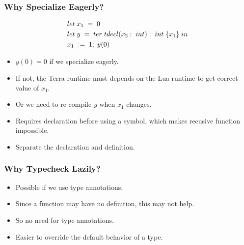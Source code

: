 \documentclass{beamer}
\begin{document}
\begin{frame}
	\frametitle{Why Specialize Eagerly?}
  \begin{equation*}
    \begin{split}
      & let \thickspace x_1\thickspace =\thickspace 0 \\
      & let \thickspace y\thickspace =\thickspace ter\thickspace tdecl(x_2:\thickspace int):\thickspace int\thickspace \{x_1\}\thickspace in \\
      & x_1\thickspace :=\thickspace 1;\thickspace y(0)
    \end{split}
  \end{equation*} \pause
  \newline
  \begin{itemize}
  \item $y(0) = 0$ if we specialize eagerly.\pause
  \item If not, the Terra runtime must depends on the Lua runtime to get correct value of $x_1$.\pause
  \item Or we need to re-compile $y$ when $x_1$ changes.\pause
  \item Requires declaration before using a symbol, which makes recusive function impossible.\pause
  \item Separate the declaration and definition.
  \end{itemize}
\end{frame}

\begin{frame}
	\frametitle{Why Typecheck Lazily?}
  \begin{itemize}
  \item Possible if we use type annotations.\pause
  \item Since a function may have no definition, this may not help.\pause
  \item So no need for type annotations.\pause
  \item Easier to override the default behavior of a type.
  \end{itemize}
\end{frame}
\end{document}
